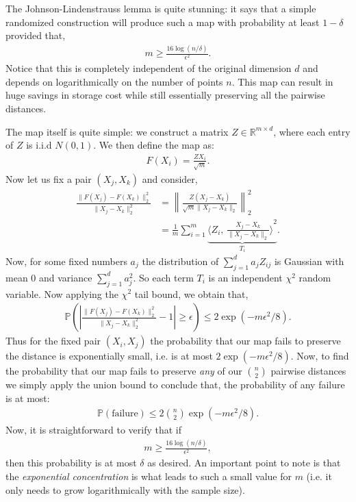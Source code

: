 \documentclass[twoside,12pt]{article}
\newcommand{\inprod}[2]{\ensuremath{\langle #1 , \, #2 \rangle}}
\begin{document}
The Johnson-Lindenstrauss lemma is quite stunning: it says that a simple randomized construction will produce such a map with probability at least $1 - \delta$ provided that,
\begin{align*}
m \geq \frac{16 \log (n/\delta) }{\epsilon^2}.
\end{align*}
Notice that this is completely independent of the original dimension $d$ and depends on logarithmically on the number of points $n$. This map can  result in huge savings in storage cost while still essentially preserving all the pairwise distances.

The map itself is quite simple: we construct a matrix $Z \in \mathbb{R}^{m \times d}$, where each entry of $Z$ is i.i.d $N(0,1)$. We then define the map as:
\begin{align*}
F(X_i) = \frac{ZX_i}{\sqrt{m}}.
\end{align*}
Now let us fix a pair $(X_j,X_k)$ and consider, 
\begin{align*}
\frac{\|F(X_j) - F(X_k)\|_2^2}{\|X_j - X_k\|_2^2} &= \left\|\frac{Z (X_j - X_k)}{\sqrt{m} \|X_j - X_k\|_2}\right\|_2^2 \\
&= \frac{1}{m} \sum_{i=1}^m \underbrace{\inprod{Z_i}{\frac{X_j - X_k}{\|X_j - X_k\|_2}}^2}_{T_i}.
\end{align*}
Now, for some fixed numbers $a_j$ the 
distribution of $\sum_{j=1}^d a_j Z_{ij}$ is Gaussian with mean 0 and variance $\sum_{j=1}^d a_j^2$.
So each term $T_i$ is an independent $\chi^2$ random variable. Now applying the $\chi^2$ tail bound, we obtain that,
\begin{align*}
\mathbb{P}\left( \left| \frac{\|F(X_j) - F(X_k)\|_2^2}{\|X_j - X_k\|_2^2} - 1 \right| \geq \epsilon \right) \leq 2 \exp (- m \epsilon^2/8).
\end{align*}
Thus for the fixed pair $(X_i,X_j)$ the probability that our map fails to preserve the distance is exponentially small, i.e. is at most 
$ 2 \exp (- m \epsilon^2/8).$ Now, to find the probability that our map fails to preserve \emph{any} of our ${n \choose 2}$ pairwise distances we simply apply the union bound to conclude that, the probability of any failure is at most:
\begin{align*}
\mathbb{P}(\text{failure}) \leq 2 {n \choose 2} \exp ( - m \epsilon^2/8).
\end{align*}
Now, it is straightforward to verify that if 
\begin{align*}
m \geq \frac{16 \log (n/\delta) }{\epsilon^2},
\end{align*}
then this probability is at most $\delta$ as desired. An important point to note is that the \emph{exponential concentration} is what leads to such a small value for $m$ (i.e. it only needs to grow logarithmically with the sample size).
\end{document}
